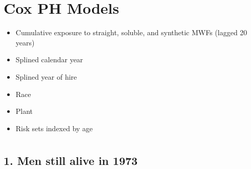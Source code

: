 \documentclass[
  11pt,
  letterpaper,
  DIV=11,
  numbers=noendperiod]{scrartcl}
\providecommand{\tightlist}{%
  \setlength{\itemsep}{0pt}\setlength{\parskip}{0pt}}\usepackage{longtable,booktabs,array}
\theoremstyle{remark}\newtheorem*{claim}{Claim}
\begin{document}
\hypertarget{cox-ph-models}{%
\section{Cox PH Models}\label{cox-ph-models}}

\linespread{1.25}

\begin{itemize}
\tightlist
\item
  Cumulative exposure to straight, soluble, and synthetic MWFs (lagged
  20 years)
\item
  Splined calendar year
\item
  Splined year of hire
\item
  Race
\item
  Plant
\item
  Risk sets indexed by age
\end{itemize}

\hypertarget{section-3}{%
\section{}\label{section-3}}

\hypertarget{men-still-alive-in-1973}{%
\subsection{1. Men still alive in 1973}\label{men-still-alive-in-1973}}
\end{document}
